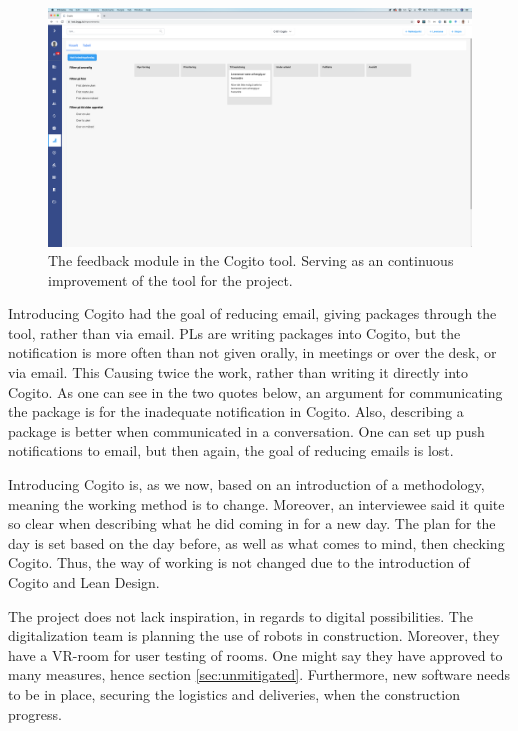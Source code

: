 \begin{figure}
    \centering
    \includegraphics[width=\textwidth]{fig/cogitos_feedback.png}
    \caption{The feedback module in the Cogito tool. Serving as an continuous improvement of the tool for the project.}
    \label{fig:cogito_feedback}
\end{figure}

Introducing Cogito had the goal of reducing email, giving packages through the tool, rather than via email. PLs are writing packages into Cogito, but the notification is more often than not given orally, in meetings or over the desk, or via email. This Causing twice the work, rather than writing it directly into Cogito. As one can see in the two quotes below, an argument for communicating the package is for the inadequate notification in Cogito. Also, describing a package is better when communicated in a conversation. One can set up push notifications to email, but then again, the goal of reducing emails is lost. 

Introducing Cogito is, as we now, based on an introduction of a methodology, meaning the working method is to change. Moreover, an interviewee said it quite so clear when describing what he did coming in for a new day. The plan for the day is set based on the day before, as well as what comes to mind, then checking Cogito. Thus, the way of working is not changed due to the introduction of Cogito and Lean Design.

The project does not lack inspiration, in regards to digital possibilities. The digitalization team is planning the use of robots in construction. Moreover, they have a VR-room for user testing of rooms. One might say they have approved to many measures, hence section \ref{sec:unmitigated}. Furthermore, new software needs to be in place, securing the logistics and deliveries, when the construction progress. 

